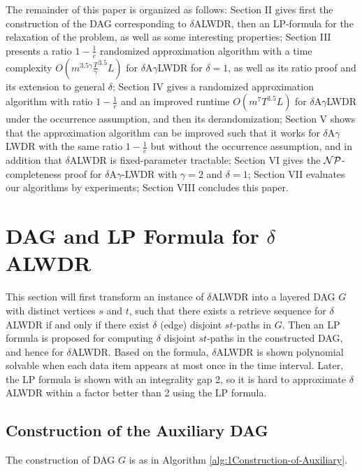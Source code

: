 \documentclass[11pt,english,onecolumn,draftcls]{IEEEtran}
\theoremstyle{plain}
\theoremstyle{plain}
\theoremstyle{plain}
\theoremstyle{plain}
\begin{document}
The remainder of this paper is organized as follows: Section II gives
first the construction of the DAG corresponding to $\delta$ALWDR,
then an LP-formula for the relaxation of the problem, as well as some
interesting properties; Section III presents a ratio $1-\frac{1}{e}$
randomized approximation algorithm with a time complexity $O(m^{3.5\gamma}\frac{T}{\gamma}^{3.5}L)$
for $\delta$A$\gamma$LWDR for $\delta=1$, as well as its ratio
proof and its extension to general $\delta$; Section IV gives a randomized
approximation algorithm with ratio $1-\frac{1}{e}$ and an improved
runtime $O(m^{7}T^{3.5}L)$ for $\delta$A$\gamma$LWDR under the
occurrence assumption, and then its derandomization; Section V shows
that the approximation algorithm can be improved such that it works
for $\delta$A$\gamma$LWDR with the same ratio $1-\frac{1}{e}$ but
without the occurrence assumption, and in addition that $\delta$ALWDR
is fixed-parameter tractable; Section VI gives the ${\cal NP}$-completeness
proof for $\delta$A$\gamma$-LWDR with $\gamma=2$ and $\delta=1$;
Section VII evaluates our algorithms by experiments; Section VIII
concludes this paper.


\section{DAG and LP Formula for $\delta$ALWDR}

This section will first transform an instance of $\delta$ALWDR into
a layered DAG $G$ with distinct vertices $s$ and $t$, such that
there exists a retrieve sequence for $\delta$ALWDR if and only if
there exist $\delta$ (edge) disjoint $st$-paths in $G$. Then an
LP formula is proposed for computing $\delta$ disjoint $st$-paths
in the constructed DAG, and hence for $\delta$ALWDR. Based on the
formula, $\delta$ALWDR is shown polynomial solvable when each data
item appears at most once in the time interval. Later, the LP formula
is shown with an integrality gap 2, so it is hard to approximate $\delta$ALWDR
within a factor better than 2 using the LP formula.


\subsection{Construction of the Auxiliary DAG }

The construction of DAG $G$ is as in Algorithm \ref{alg:1Construction-of-Auxiliary}.
\end{document}
